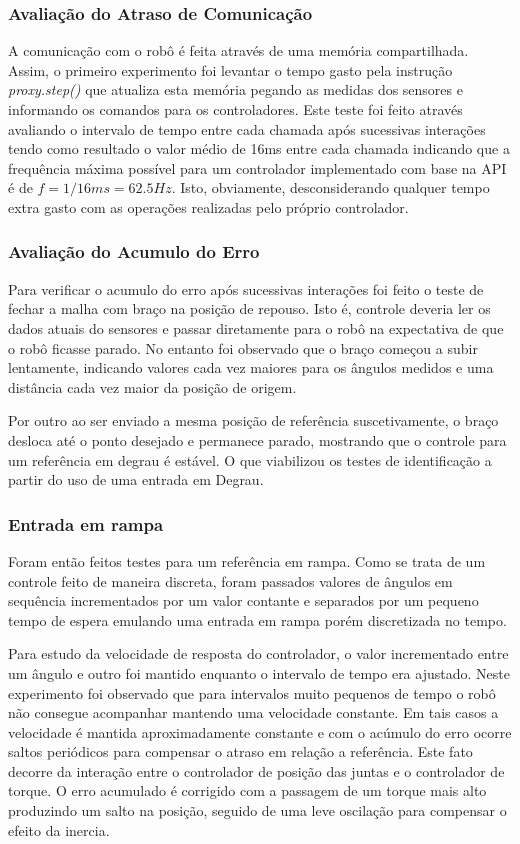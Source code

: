 \subsubsection{Avaliação do Atraso de Comunicação}

A comunicação com o robô é feita através de uma memória compartilhada. Assim, o primeiro experimento foi levantar o tempo gasto pela instrução \textit{proxy.step()} que atualiza esta memória pegando as medidas dos sensores e informando os comandos para os controladores. Este teste foi feito através avaliando o intervalo de tempo entre cada chamada após sucessivas interações tendo como resultado o valor médio de 16ms entre cada chamada indicando que a frequência máxima possível para um controlador implementado com base na API é de $f = 1/16ms = 62.5Hz$. Isto, obviamente, desconsiderando qualquer tempo extra gasto com as operações realizadas pelo próprio controlador.

\subsubsection{Avaliação do Acumulo do Erro}

Para verificar o acumulo do erro após sucessivas interações foi feito o teste de fechar a malha com braço na posição de repouso. Isto é, controle deveria ler os dados atuais do sensores e passar diretamente para o robô na expectativa de que o robô ficasse parado. No entanto foi observado que o braço começou a subir lentamente, indicando valores cada vez maiores para os ângulos medidos e uma distância cada vez maior da posição de origem.

Por outro ao ser enviado a mesma posição de referência suscetivamente, o braço desloca até o ponto desejado e permanece parado, mostrando que o controle para um referência em degrau é estável. O que viabilizou os testes de identificação a partir do uso de uma entrada em Degrau.

\subsubsection{Entrada em rampa}

Foram então feitos testes para um referência em rampa. Como se trata de um controle feito de maneira discreta, foram passados valores de ângulos em sequência incrementados por um valor contante e separados por um pequeno tempo de espera emulando uma entrada em rampa porém discretizada no tempo.

Para estudo da velocidade de resposta do controlador, o valor incrementado entre um ângulo e outro foi mantido enquanto o intervalo de tempo era ajustado. Neste experimento foi observado que para intervalos muito pequenos de tempo o robô não consegue acompanhar mantendo uma velocidade constante. Em tais casos a velocidade é mantida aproximadamente constante e com o acúmulo do erro ocorre saltos periódicos para compensar o atraso em relação a referência. Este fato decorre da interação entre o controlador de posição das juntas e o controlador de torque. O erro acumulado é corrigido com a passagem de um torque mais alto produzindo um salto na posição, seguido de uma leve oscilação para compensar o efeito da inercia.

